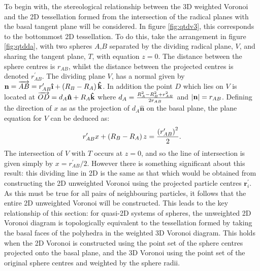 To begin with, the stereological relationship between the 3D weighted Voronoi and the 2D tessellation formed from the intersection of the radical planes with the basal tangent plane will be considered.
In figure \ref{fig:qtdv3}, this corresponds to the bottommost 2D tessellation.
To do this, take the arrangement in figure \ref{fig:qtdda}, with two spheres $A$,$B$ separated by the dividing radical plane, $V$, and sharing the tangent plane, $T$, with equation $z=0$.
The distance between the sphere centres is $r_{AB}$, whilst the distance between the projected centres is denoted $r_{AB}^\prime$.
The dividing plane $V$, has a normal given by $\mathbf{n} =\overrightarrow{AB}=r_{AB}^\prime\boldsymbol{\hat{\textbf{\i}}}+\left(\rs_B-\rs_A\right)\mathbf{\hat{k}}$.
In addition the point $D$ which lies on $V$ is located at $\overrightarrow{OD}=d_{A}\mathbf{\hat{n}}+R_A\mathbf{\hat{k}}$ where $d_{A}=\frac{R_A^2-R_B^2+r_{AB}^2}{2r_{AB}}$ and $\lvert\mathbf{n}\rvert=r_{AB}$.
Defining the direction of $x$ as as the projection of $d_A\mathbf{\hat{n}}$ on the basal plane, the plane equation for $V$ can be deduced as:
\begin{equation}
	\label{eq:plane}
	r_{AB}^\prime x+\left(R_B-R_A\right)z=\frac{\left(r_{AB}^\prime\right)^2}{2}.
\end{equation}
The intersection of $V$ with $T$ occurs at $z=0$, and so the line of intersection is given simply by $x=r_{AB}^\prime/2$.
However there is something significant about this result: this dividing line in 2D is the same as that which would be obtained from constructing the 2D unweighted Voronoi using the projected particle centres $\mathbf{r}^\prime_i$.
As this must be true for all pairs of neighbouring particles, it follows that the entire 2D unweighted Voronoi will be constructed. 
This leads to the key relationship of this section: for quasi\--2D systems of spheres, the unweighted 2D Voronoi diagram is topologically equivalent to the tessellation formed by taking the basal faces of the polyhedra in the weighted 3D Voronoi diagram. 
This holds when the 2D Voronoi is constructed using the point set of the sphere centres projected onto the basal plane, and the 3D Voronoi using the point set of the original sphere centres and weighted by the sphere radii.

